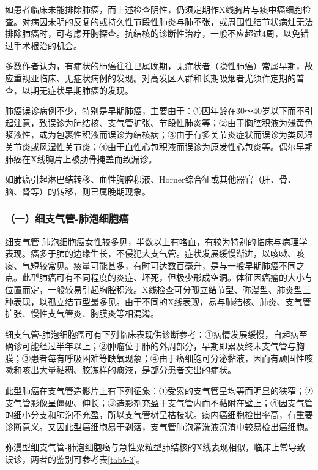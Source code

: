 如患者临床未能排除肺癌，而上述检查阴性，仍须定期作X线胸片与痰中癌细胞检查。对病因未明的反复的或持久性节段性肺炎与肺不张，或周围性结节状病灶无法排除肺癌时，可考虑开胸探查。抗结核的诊断性治疗，一般不应超过4周，以免错过手术根治的机会。

多数作者认为，有症状的肺癌往往已属晚期，无症状者（隐性肺癌）常属早期，故应重视亚临床、无症状病例的发现。对高发区人群和长期吸烟者尤须作定期的普查，以期无症状早期肺癌的发现。

肺癌误诊病例不少，特别是早期肺癌，主要由于：①因年龄在30～40岁以下而不引起注意，致误诊为肺结核、支气管扩张、节段性肺炎等；②由于胸腔积液为浅黄色浆液性，或为包裹性积液而误诊为结核病；③由于有多关节炎症状而误诊为类风湿关节炎或风湿性关节炎；④由于血性心包积液而误诊为原发性心包炎等。偶尔早期肺癌在X线胸片上被肋骨掩盖而致漏诊。

如肺癌引起淋巴结转移、血性胸腔积液、Horner综合征或其他器官（肝、骨、脑、肾等）的转移，则已属晚期现象。

\subsubsection{（一）细支气管-肺泡细胞癌}

细支气管-肺泡细胞癌女性较多见，半数以上有咯血，有较为特别的临床与病理学表现。癌多于肺的边缘生长，不侵犯大支气管。症状发展缓慢渐进，以咳嗽、咳痰、气短较常见。痰量可能甚多，有时可达数百毫升，是与一般早期肺癌不同之点。此型肺癌可有不同程度的炎症、坏死，但极少形成空洞。体征因癌瘤的大小与位置而定，一般较易引起胸腔积液。X线检查可分孤立结节型、弥漫型、肺炎型三种表现，以孤立结节型最多见。由于不同的X线表现，易与肺结核、肺炎、支气管扩张、慢性支气管炎、胸膜炎等相混淆。

细支气管-肺泡细胞癌可有下列临床表现供诊断参考：①病情发展缓慢，自起病至确诊可能经过半年以上；②肿瘤位于肺的外周部分，早期即累及终末支气管与胸膜；③患者每有呼吸困难等缺氧现象；④由于癌细胞可分泌黏液，因而有顽固性咳嗽和咳出大量黏稠、胶冻样的痰液，是部分患者突出的症状。

此型肺癌在支气管造影片上有下列征象：①受累的支气管呈均等而明显的狭窄；②支气管影像呈僵硬、伸长；③造影剂充盈于支气管内而不黏附在壁上；④因支气管的细小分支和肺泡不充盈，所以支气管树呈枯枝状。痰内癌细胞检出率高，有重要诊断意义。又因此型癌细胞易于剥落，支气管肺泡灌洗液沉渣中较易检出癌细胞。

弥漫型细支气管-肺泡细胞癌与急性粟粒型肺结核的X线表现相似，临床上常导致误诊，两者的鉴别可参考表\ref{tab5-3}。

